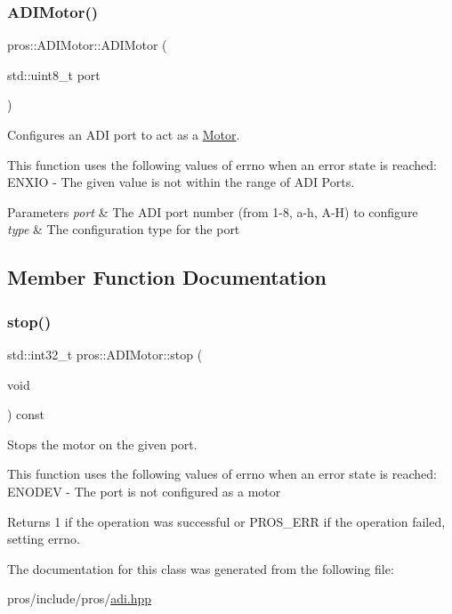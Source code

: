 \subsubsection{\texorpdfstring{A\+D\+I\+Motor()}{ADIMotor()}}
{\footnotesize\ttfamily pros\+::\+A\+D\+I\+Motor\+::\+A\+D\+I\+Motor (\begin{DoxyParamCaption}\item[{std\+::uint8\+\_\+t}]{port }\end{DoxyParamCaption})}



Configures an A\+DI port to act as a \hyperlink{classpros_1_1Motor}{Motor}. 

This function uses the following values of errno when an error state is reached\+: E\+N\+X\+IO -\/ The given value is not within the range of A\+DI Ports.


\begin{DoxyParams}{Parameters}
{\em port} & The A\+DI port number (from 1-\/8, \textquotesingle{}a\textquotesingle{}-\/\textquotesingle{}h\textquotesingle{}, \textquotesingle{}A\textquotesingle{}-\/\textquotesingle{}H\textquotesingle{}) to configure \\
\hline
{\em type} & The configuration type for the port \\
\hline
\end{DoxyParams}


\subsection{Member Function Documentation}
\mbox{\label{classpros_1_1ADIMotor_ad8e9be8dfbc022e893a4d15996fe3bcd}} 
\subsubsection{\texorpdfstring{stop()}{stop()}}
{\footnotesize\ttfamily std\+::int32\+\_\+t pros\+::\+A\+D\+I\+Motor\+::stop (\begin{DoxyParamCaption}\item[{void}]{ }\end{DoxyParamCaption}) const}



Stops the motor on the given port. 

This function uses the following values of errno when an error state is reached\+: E\+N\+O\+D\+EV -\/ The port is not configured as a motor

\begin{DoxyReturn}{Returns}
1 if the operation was successful or P\+R\+O\+S\+\_\+\+E\+RR if the operation failed, setting errno. 
\end{DoxyReturn}


The documentation for this class was generated from the following file\+:\begin{DoxyCompactItemize}
\item 
pros/include/pros/\hyperlink{adi_8hpp}{adi.\+hpp}\end{DoxyCompactItemize}
